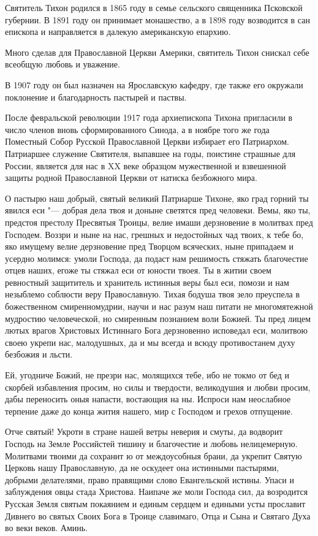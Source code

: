 \begin{mymulticols}

Святитель Тихон родился в 1865 году в семье сельского священника Псковской губернии. В 1891 году он принимает монашество, а в 1898 году возводится в сан епископа и направляется в далекую американскую епархию.

Много сделав для Православной Церкви Америки, святитель Тихон снискал себе всеобщую любовь и уважение.

В 1907 году он был назначен на Ярославскую кафедру, где также его окружали поклонение и благодарность пастырей и паствы.

После февральской революции 1917 года архиепископа Тихона пригласили в число членов вновь сформированного Синода, а в ноябре того же года Поместный Собор Русской Православной Церкви избирает его Патриархом. Патриаршее служение Святителя, выпавшее на годы, поистине страшные для России, является для нас в XX веке образцом мужественной и взвешенной защиты родной Православной Церкви от натиска безбожного мира.




О пастырю наш добрый, святый великий Патриарше Тихоне, яко град горний ты явился еси "--- добрая дела твоя и доныне светятся пред человеки. Вемы, яко ты, предстоя престолу Пресвятыя Троицы, велие имаши дерзновение в молитвах пред Господем. Воззри и ныне на нас, грешных и недостойных чад твоих, к тебе бо, яко имущему велие дерзновение пред Творцом всяческих, ныне припадаем и усердно молимся: умоли Господа, да подаст нам решимость стяжать благочестие отцев наших, егоже ты стяжал еси от юности твоея. Ты в житии своем ревностный защититель и хранитель истинныя веры был еси, помози и нам незыблемо соблюсти веру Православную. Тихая бодуша твоя зело преуспела в божественном смиренномудрии, научи и нас разум наш питати не многомятежной мудростию человеческой, но смиренным познанием воли Божией. Ты пред лицем лютых врагов Христовых Истиннаго Бога дерзновенно исповедал еси, молитвою своею укрепи нас, малодушных, да и мы всегда и всюду противостанем духу безбожия и льсти.

Ей, угодниче Божий, не презри нас, молящихся тебе, ибо не токмо от бед и скорбей избавления просим, но силы и твердости, великодушия и любви просим, дабы переносить оныя напасти, востающия на ны. Испроси нам неослабное терпение даже до конца жития нашего, мир с Господом и грехов отпущение.

Отче святый! Укроти в стране нашей ветры неверия и смуты, да водворит Господь на Земле Российстей тишину и благочестие и любовь нелицемерную. Молитвами твоими да сохранит ю от междоусобныя брани, да укрепит Святую Церковь нашу Православную, да не оскудеет она истинными пастырями, добрыми делателями, право правящими слово Евангельской истины. Упаси и заблуждения овцы стада Христова. Наипаче же моли Господа сил, да возродится Русская Земля святым покаянием и единым сердцем и едиными усты прославит Дивнего во святых Своих Бога в Троице славимаго, Отца и Сына и Святаго Духа во веки веков. Аминь.

\end{mymulticols}

